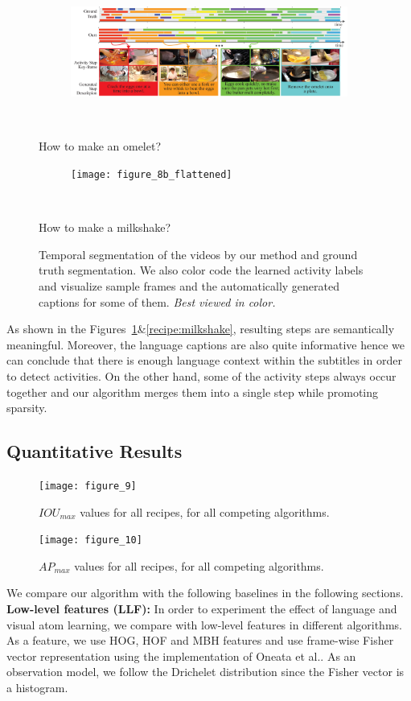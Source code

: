 \begin{figure}[ht]
  \begin{subfigure}[b]{\textwidth}
    \includegraphics[width=\textwidth]{figure_8a_flattened}
  \end{subfigure}~
\caption{How to make an omelet?}
      \label{recipe:ommelette}
       \begin{subfigure}[b]{\textwidth}
    \texttt{[image: figure\_8b\_flattened]}
  \end{subfigure}~
 \caption{How to make a milkshake?}
    \label{recipe:milkshake}
\caption{Temporal segmentation of the videos by our method and ground truth segmentation. We also color code the learned activity labels and visualize sample frames and the automatically generated captions for some of them. \emph{Best viewed in color.}}
\label{recipe:ommelette}
\fi
\end{figure}

As shown in the Figures~\ref{recipe:ommelette}\&\ref{recipe:milkshake}, resulting steps are semantically meaningful. Moreover, the language captions are also quite informative hence we can conclude that there is enough language context within the subtitles in order to detect activities. On the other hand, some of the activity steps always occur together and our algorithm merges them into a single step while promoting sparsity.
\subsection{Quantitative Results}
\begin{figure}[t]
  \texttt{[image: figure\_9]}
  \caption{$IOU_{max}$ values for all recipes, for all competing algorithms.}
  \label{mIOU}
\texttt{[image: figure\_10]}
\caption{$AP_{max}$ values for all recipes, for all competing algorithms.}
\label{mmAP}
\end{figure}

We compare our algorithm with the following baselines in the following sections.
\noindent\textbf{Low-level features (LLF):}
In order to experiment the effect of language and visual atom learning, we compare with low-level features in different algorithms. As a feature, we use HOG, HOF and MBH features and use frame-wise Fisher vector representation using the implementation of Oneata et al.\cite{fastLaptev}. As an observation model, we follow the Drichelet distribution since the Fisher vector is a histogram.

